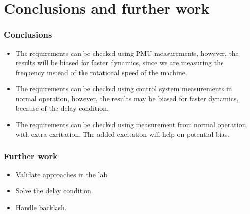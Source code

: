 \section{Conclusions and further work}
\begin{frame}
	\frametitle{Conclusions}
	\begin{itemize}
		\item The requirements can be checked using PMU-measurements, however, the results will be biased for faster dynamics, since we are measuring the frequency instead of the rotational speed of the machine.
		\item The requirements can be checked using control system measurements in normal operation, however, the results may be biased for faster dynamics, because of the delay condition.
		\item The requirements can be checked using measurement from normal operation with extra excitation. The added excitation will help on potential bias.
	\end{itemize}
\end{frame}
\begin{frame}
	\frametitle{Further work}
	\begin{itemize}
		\item Validate approaches in the lab
		\item Solve the delay condition.
		\item Handle backlash.
	\end{itemize}
\end{frame}
